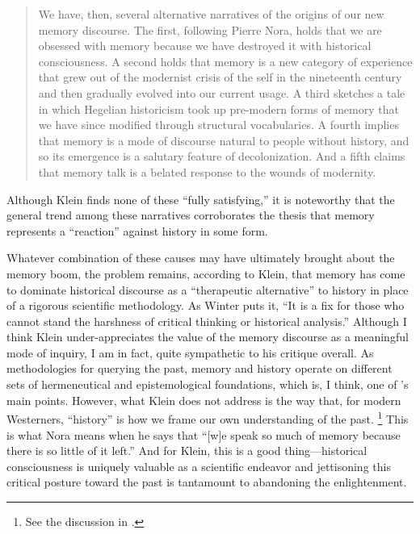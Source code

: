 \begin{quote}
    We have, then, several alternative narratives of the origins of our new memory discourse. The first, following Pierre Nora, holds that we are obsessed with memory because we have destroyed it with historical consciousness. A second holds that memory is a new category of experience that grew out of the modernist crisis of the self in the nineteenth century and then gradually evolved into our current usage. A third sketches a tale in which Hegelian historicism took up pre-modern forms of memory that we have since modified through structural vocabularies. A fourth implies that memory is a mode of discourse natural to people without history, and so its emergence is a salutary feature of decolonization. And a fifth claims that memory talk is a belated response to the wounds of modernity.%
        \autocite[134]{klein_klein2011}
\end{quote}  
\noindent
Although Klein finds none of these ``fully satisfying,'' it is noteworthy that the general trend among these narratives corroborates the thesis that memory represents a ``reaction'' against history in some form.  

Whatever combination of these causes may have ultimately brought about the memory boom, the problem remains, according to Klein, that memory has come to dominate historical discourse as a ``therapeutic alternative'' to history in place of a rigorous scientific methodology.%
    \autocite[137]{klein2011}
As Winter puts it, ``It is a fix for those who cannot stand the harshness of critical thinking or historical analysis.''%
    \autocite[283 (summarizing Klein)]{winter2006}
Although I think Klein under-appreciates the value of the memory discourse as a meaningful mode of inquiry, I am in fact, quite sympathetic to his critique overall. As methodologies for querying the past, memory and history operate on different sets of hermeneutical and epistemological foundations, which is, I think, one of \yerushalmi's main points. 
%
%
However, what Klein does not address is the way that, for modern Westerners, ``history'' is how we frame our own understanding of the past.%
    \footnote{%
        See the discussion in
        \cite{schwarz_radstone-schwarz2011}.}    
This is what Nora means when he says that ``[w]e speak so much of memory because there is so little of it left.''%
    \autocite[7]{nora_representations1989}
And for Klein, this is a good thing---historical consciousness is uniquely valuable as a scientific endeavor and jettisoning this critical posture toward the past is tantamount to abandoning the enlightenment.  

